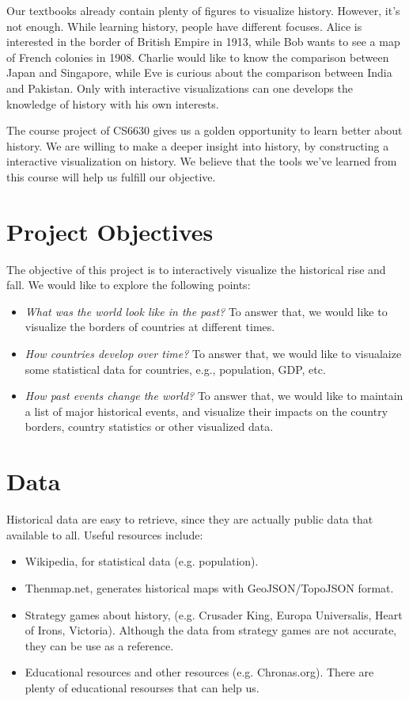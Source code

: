 \documentclass[12pt, fullpage,letterpaper]{article}
\begin{document}
Our textbooks already contain plenty of figures to visualize history. However,
it's not enough. While learning history, people have different focuses.  Alice
is interested in the border of British Empire in 1913, while Bob wants to see a
map of French colonies in 1908. Charlie would like to know the comparison
between Japan and Singapore, while Eve is curious about the comparison between
India and Pakistan.  Only with interactive visualizations can one develops the
knowledge of history with his own interests.

The course project of CS6630 gives us a golden opportunity to learn better
about history.  We are willing to make a deeper insight into history, by
constructing a interactive visualization on history. We believe that the tools
we've learned from this course will help us fulfill our objective.


\section{Project Objectives}
The objective of this project is to interactively visualize the historical rise
and fall.  We would like to explore the following points:
\begin{itemize}
    \item \emph{What was the world look like in the past?} To answer that, we
        would like to visualize the borders of countries at different times.
    \item \emph{How countries develop over time?} To answer that, we would
        like to visualaize some statistical data for countries, e.g.,
        population, GDP, etc.
    \item \emph{How past events change the world?} To answer that, we would
        like to maintain a list of major historical events, and visualize their
        impacts on the country borders, country statistics or other visualized
        data.
\end{itemize}
\section{Data}
Historical data are easy to retrieve, since they are actually public data that available to all.
Useful resources include:

\begin{itemize}
    \item Wikipedia, for statistical data (e.g. population).
    \item Thenmap.net, generates historical maps with GeoJSON/TopoJSON format.
    \item Strategy games about history, (e.g. Crusader King, Europa Universalis, Heart of Irons, Victoria). Although the data from strategy games are not accurate, they can be use
        as a reference.
    \item Educational resources and other resources (e.g. Chronas.org). There are plenty of educational resourses that can help us.
\end{itemize}
\end{document}
